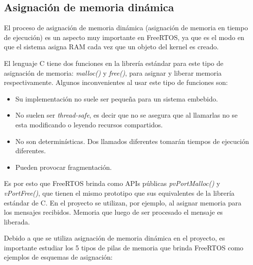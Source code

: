 \documentclass{IEEEtran}
\begin{document}
\subsection{Asignación de memoria dinámica}
El proceso de asignación de memoria dinámica (asignación de memoria en tiempo de ejecución) es un aspecto muy importante en FreeRTOS, ya que es el modo en que el sistema asigna RAM cada vez que un objeto del kernel es creado.

El lenguaje C tiene dos funciones en la librería estándar para este tipo de asignación de memoria: \textit{malloc()} y \textit{free()}, para asignar y liberar memoria respectivamente. Algunos inconvenientes al usar este tipo de funciones son:

\begin{itemize}
    \item Su implementación no suele ser pequeña para un sistema embebido.
    \item No suelen ser \textit{thread-safe}, es decir que no se asegura que al llamarlas no se esta modificando o leyendo recursos compartidos.
    \item No son determinísticas. Dos llamados diferentes tomarán tiempos de ejecución diferentes.
    \item Pueden provocar fragmentación.
\end{itemize}

Es por esto que FreeRTOS brinda como APIs públicas \textit{pvPortMalloc()} y \textit{vPortFree()}, que tienen el mismo prototipo que sus equivalentes de la librería estándar de C. En el proyecto se utilizan, por ejemplo, al asignar memoria para los mensajes recibidos. Memoria que luego de ser procesado el mensaje es liberada.

Debido a que se utiliza asignación de memoria dinámica en el proyecto, es importante estudiar los 5 tipos de pilas de memoria que brinda FreeRTOS como ejemplos de esquemas de asignación:
\end{document}
